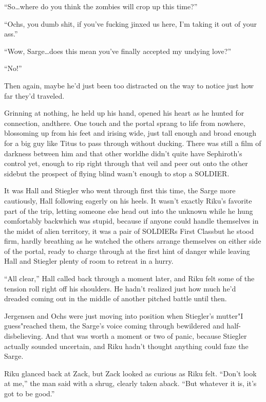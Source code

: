 ``So\ldots where do you think the zombies will crop up this time?''

``Ochs, you dumb shit, if you've fucking jinxed us here, I'm taking it out of your ass.''

``Wow, Sarge\ldots does this mean you've finally accepted my undying love?''

``No!''

Then again, maybe he'd just been too distracted on the way to notice just how far they'd traveled.

Grinning at nothing, he held up his hand, opened his heart as he hunted for connection, and\textemdash there. One touch and the portal sprang to life from nowhere, blossoming up from his feet and irising wide, just tall enough and broad enough for a big guy like Titus to pass through without ducking. There was still a film of darkness between him and that other world\textemdash he didn't quite have Sephiroth's control yet, enough to rip right through that veil and peer out onto the other side\textemdash but the prospect of flying blind wasn't enough to stop a SOLDIER.

It was Hall and Stiegler who went through first this time, the Sarge more cautiously, Hall following eagerly on his heels. It wasn't exactly Riku's favorite part of the trip, letting someone else head out into the unknown while he hung comfortably back\textemdash which was stupid, because if anyone could handle themselves in the midst of alien territory, it was a pair of SOLDIERs First Class\textemdash but he stood firm, hardly breathing as he watched the others arrange themselves on either side of the portal, ready to charge through at the first hint of danger while leaving Hall and Stiegler plenty of room to retreat in a hurry.

``All clear,'' Hall called back through a moment later, and Riku felt some of the tension roll right off his shoulders. He hadn't realized just how much he'd dreaded coming out in the middle of another pitched battle until then.

Jergensen and Ochs were just moving into position when Stiegler's mutter\textemdash "I guess"\textemdash reached them, the Sarge's voice coming through bewildered and half-disbelieving. And that was worth a moment or two of panic, because Stiegler actually sounded uncertain, and Riku hadn't thought anything could faze the Sarge.

Riku glanced back at Zack, but Zack looked as curious as Riku felt. ``Don't look at me,'' the man said with a shrug, clearly taken aback. ``But whatever it is, it's got to be good.''

